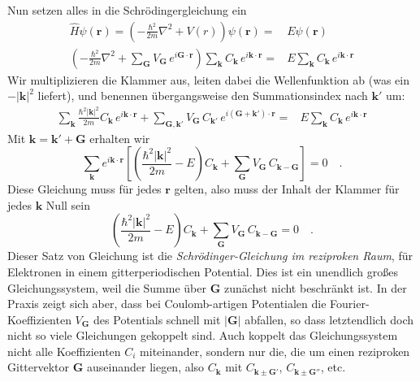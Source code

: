 Nun setzen alles in die Schrödingergleichung ein
\begin{eqnarray}
    \hat{H}  \psi(\mathbf{r}) = \left( - \frac{\hbar^2}{2m} \nabla^2 + V(r) \right) \psi(\mathbf{r}) =  & E  \psi(\mathbf{r}) \\
     \left( - \frac{\hbar^2}{2m} \nabla^2 + \sum_{\mathbf{G}} V_{\mathbf{G}} \, e^{i \mathbf{G}  \cdot \mathbf{r} } \right) \sum_{\mathbf{k}} C_{\mathbf{k}} \, e^{i \mathbf{k} \cdot \mathbf{r} } =  & E  \sum_{\mathbf{k}} C_{\mathbf{k}} \, e^{i \mathbf{k} \cdot \mathbf{r} }
\end{eqnarray}
Wir multiplizieren die Klammer aus, leiten dabei die Wellenfunktion ab (was ein $- | \mathbf{k}|^2$ liefert), und benennen übergangsweise den Summationsindex nach $\mathbf{k}'$ um:
\begin{eqnarray}
    \sum_{\mathbf{k}}  \frac{\hbar^2 | \mathbf{k}|^2}{2m} C_{\mathbf{k}} \, e^{i \mathbf{k} \cdot \mathbf{r} } 
    + \sum_{\mathbf{G}, \mathbf{k}'} V_{\mathbf{G}} \, C_{\mathbf{k}'} \, e^{i (\mathbf{G}+\mathbf{k}')  \cdot \mathbf{r} }  
    =  & E  \sum_{\mathbf{k}} C_{\mathbf{k}} \,       e^{i \mathbf{k} \cdot \mathbf{r} } 
\end{eqnarray}
Mit $\mathbf{k} = \mathbf{k}' + \mathbf{G}$ erhalten wir 
\begin{equation}
    \sum_{\mathbf{k}}   e^{i \mathbf{k} \cdot \mathbf{r} } 
    \left[
        \left( \frac{\hbar^2 | \mathbf{k}|^2}{2m} - E \right) C_{\mathbf{k}}
    + \sum_{\mathbf{G}} V_{\mathbf{G}} \, C_{\mathbf{k}- \mathbf{G}} 
    \right]
    = 0  \quad .
\end{equation}
Diese Gleichung muss für jedes $\mathbf{r}$ gelten, also muss der Inhalt der Klammer für jedes $\mathbf{k}$  Null sein
\begin{equation}
        \left( \frac{\hbar^2 | \mathbf{k}|^2}{2m} - E \right) C_{\mathbf{k}}
    + \sum_{\mathbf{G}} V_{\mathbf{G}} \, C_{\mathbf{k}- \mathbf{G}} 
    = 0  \quad . \label{eq:2_SG_rezi}
\end{equation}
Dieser Satz von Gleichung ist die \emph{Schrödinger-Gleichung im reziproken Raum}, für Elektronen in einem gitterperiodischen Potential. Dies ist ein unendlich großes Gleichungssystem, weil die Summe über $\mathbf{G}$ zunächst nicht beschränkt ist. In der Praxis zeigt sich aber, dass bei Coulomb-artigen Potentialen die Fourier-Koeffizienten  $ V_{\mathbf{G}} $ des Potentials schnell mit $|\mathbf{G}|$ abfallen, so dass letztendlich doch nicht so viele Gleichungen gekoppelt sind. 
Auch koppelt das Gleichungssystem nicht alle Koeffizienten $C_i$ miteinander, sondern nur die, die  um einen reziproken Gittervektor $\mathbf{G}$ auseinander liegen, also $C_\mathbf{k}$ mit $C_\mathbf{k \pm G'}$, $C_\mathbf{k \pm G''}$, etc. 

